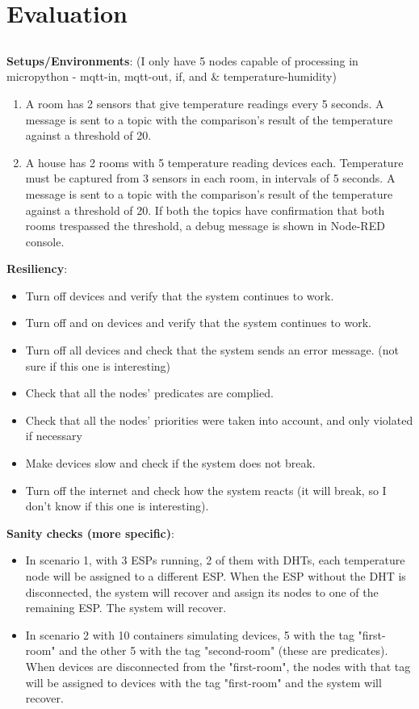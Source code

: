 \chapter{Evaluation} \label{chap:evaluation}

\section*{}

\textbf{Setups/Environments}:
(I only have 5 nodes capable of processing in micropython - mqtt-in, mqtt-out, if, and \& temperature-humidity)
\begin{enumerate}
    \item A room has 2 sensors that give temperature readings every 5  seconds. A message is sent to a topic with the comparison's result of the temperature against a threshold of 20.
    \item A house has 2 rooms with 5 temperature reading devices each. Temperature must be captured from 3 sensors in each room, in intervals of 5 seconds. A message is sent to a topic with the comparison's result of the temperature against a threshold of 20. If both the topics have confirmation that both rooms trespassed the threshold, a debug message is shown in Node-RED console.
\end{enumerate}

\textbf{Resiliency}:
\begin{itemize}
    \item Turn off devices and verify that the system continues to work.
    \item Turn off and on devices and verify that the system continues to work.
    \item Turn off all devices and check that the system sends an error message. (not sure if this one is interesting)
    \item Check that all the nodes' predicates are complied.
    \item Check that all the nodes' priorities were taken into account, and only violated if necessary
    \item Make devices slow and check if the system does not break.    \item Turn off the internet and check how the system reacts (it will break, so I don't know if this one is interesting).
\end{itemize}

\textbf{Sanity checks (more specific)}:
\begin{itemize}
    \item In scenario 1, with 3 ESPs running, 2 of them with DHTs, each temperature node will be assigned to a different ESP. When the ESP without the DHT is disconnected, the system will recover and assign its nodes to one of the remaining ESP. The system will recover.
    \item In scenario 2 with 10 containers simulating devices, 5 with the tag "first-room" and the other 5 with the tag "second-room" (these are predicates). When devices are disconnected from the "first-room", the nodes with that tag will be assigned to devices with the tag "first-room" and the system will recover.
\end{itemize}




